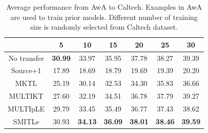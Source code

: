 \begin{table}[htbp]
  \centering
  \caption{Average performance from AwA to Caltech. Examples in AwA are used to train prior models. Different number of training size is randomly selected from Caltech dataset.}
    \begin{tabular}{ccccccc}
    \toprule
                & 5              & 10             & 15             & 20             & 25             & 30 \\
    \midrule
    No transfer &         \textbf{30.99 } &         33.97  &         35.95 &         37.78  &         38.27  &         39.39  \\
    Source+1    &         17.89  &         18.69  &         18.79  &         19.69  &         19.39  &         20.20  \\
    MKTL        &         25.19  &         30.14  &         32.53  &         34.30  &         35.83  &         36.66  \\
    MULTIKT     &         27.60  &         32.19  &         34.51  &         36.78  &         37.79  &         39.27  \\
    MULTIpLE    &         29.79  &         33.45  &         35.49  &         36.77  &         37.43  &         38.62  \\
    SMITLe        &       30.93  &         \textbf{34.13 } &         \textbf{36.09 } &         \textbf{38.01} &         \textbf{38.46} &         \textbf{39.59} \\
    \bottomrule
    \end{tabular}%
  \label{tab:A2C}%
\end{table}%

